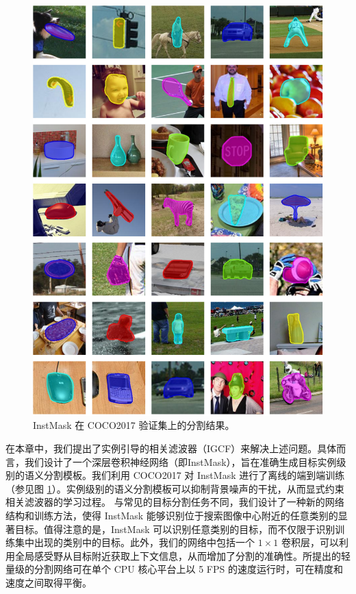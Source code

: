 \begin{figure}
\centering
\includegraphics[width=1.0\textwidth]{Img/IGCF/coco.pdf}
\caption{InstMask 在 COCO2017 \cite{COCO} 验证集上的分割结果。}
\label{fig:InstMask}
\end{figure}

在本章中，我们提出了实例引导的相关滤波器（IGCF）来解决上述问题。具体而言，我们设计了一个深层卷积神经网络（即InstMask），旨在准确生成目标实例级别的语义分割模板。我们利用 COCO2017 \cite{COCO} 对 InstMask 进行了离线的端到端训练（参见图 \ref{fig:InstMask}）。实例级别的语义分割模板可以抑制背景噪声的干扰，从而显式约束相关滤波器的学习过程。
与常见的目标分割任务不同，我们设计了一种新的网络结构和训练方法，使得 InstMask 能够识别位于搜索图像中心附近的任意类别的显著目标。值得注意的是，InstMask 可以识别任意类别的目标，而不仅限于识别训练集中出现的类别中的目标。此外，我们的网络中包括一个 $1 \times 1$ 卷积层，可以利用全局感受野从目标附近获取上下文信息，从而增加了分割的准确性。所提出的轻量级的分割网络可在单个 CPU 核心平台上以 5 FPS 的速度运行时，可在精度和速度之间取得平衡。

